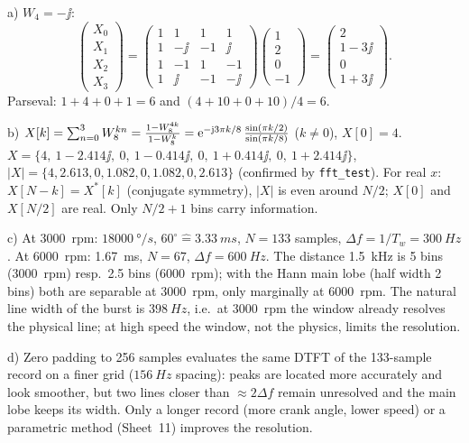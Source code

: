 \begin{solution}
a) $W_4=-\jj$:
\[
\begin{pmatrix}X_0\\X_1\\X_2\\X_3\end{pmatrix}=
\begin{pmatrix}1&1&1&1\\1&-\jj&-1&\jj\\1&-1&1&-1\\1&\jj&-1&-\jj\end{pmatrix}
\begin{pmatrix}1\\2\\0\\-1\end{pmatrix}=
\begin{pmatrix}2\\1-3\jj\\0\\1+3\jj\end{pmatrix}.
\]
Parseval: $1+4+0+1=6$ and $(4+10+0+10)/4=6$.

b) $X[k]=\sum_{n=0}^{3}W_8^{kn}=\frac{1-W_8^{4k}}{1-W_8^k}
=\mathrm{e}^{-\mathrm{j}3\pi k/8}\,\frac{\sin(\pi k/2)}{\sin(\pi k/8)}$ ($k\neq0$), $X[0]=4$.
$X=\{4,\ 1-2.414\jj,\ 0,\ 1-0.414\jj,\ 0,\ 1+0.414\jj,\ 0,\ 1+2.414\jj\}$,
$|X|=\{4,2.613,0,1.082,0,1.082,0,2.613\}$ (confirmed by \texttt{fft\_test}).
For real $x$: $X[N-k]=X^*[k]$ (conjugate symmetry), $|X|$ is even around
$N/2$; $X[0]$ and $X[N/2]$ are real. Only $N/2+1$ bins carry information.

c) At \SI{3000}{rpm}: $\SI{18000}{\degree/s}$, $60^\circ\hat=\SI{3.33}{ms}$,
$N=133$ samples, $\Delta f=1/T_w=\SI{300}{Hz}$. At \SI{6000}{rpm}: \SI{1.67}{ms},
$N=67$, $\Delta f=\SI{600}{Hz}$. The distance \SI{1.5}{kHz} is 5 bins
(\SI{3000}{rpm}) resp.\ 2.5 bins (\SI{6000}{rpm}); with the Hann main lobe
(half width 2 bins) both are separable at \SI{3000}{rpm}, only marginally at
\SI{6000}{rpm}. The natural line width of the burst is $\SI{398}{Hz}$, i.e.\
at \SI{3000}{rpm} the window already resolves the physical line; at high speed
the window, not the physics, limits the resolution.

d) Zero padding to 256 samples evaluates the same DTFT of the 133-sample record
on a finer grid ($\SI{156}{Hz}$ spacing): peaks are located more accurately and
look smoother, but two lines closer than $\approx2\Delta f$ remain unresolved and
the main lobe keeps its width. Only a longer record (more crank angle, lower
speed) or a parametric method (Sheet~11) improves the resolution.


\end{solution}
